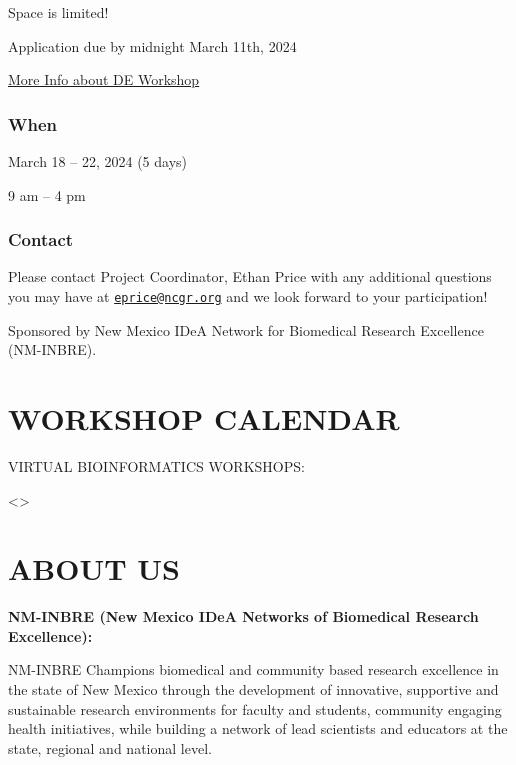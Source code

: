 \documentclass[
]{book}
\begin{document}
Space is limited!

Application due by midnight March 11th, 2024

\href{https://inbre.ncgr.org/ncgr-INBRE-2024/differential-expression-workshop.html\#differential-expression-workshop}{More Info about DE Workshop}

\hypertarget{when}{%
\subsection*{When}\label{when}}

March 18 -- 22, 2024 (5 days)

9 am -- 4 pm

\hypertarget{contact}{%
\subsection*{Contact}\label{contact}}

Please contact Project Coordinator, Ethan Price with any additional questions you may have at \href{mailto:eprice@ncgr.org}{\nolinkurl{eprice@ncgr.org}} and we look forward to your participation!

Sponsored by New Mexico IDeA Network for Biomedical Research Excellence (NM-INBRE).

\hypertarget{workshop-calendar}{%
\chapter*{WORKSHOP CALENDAR}\label{workshop-calendar}}

VIRTUAL BIOINFORMATICS WORKSHOPS:

\textless{}\textgreater{}

\hypertarget{about-us}{%
\chapter*{ABOUT US}\label{about-us}}

\textbf{NM-INBRE (New Mexico IDeA Networks of Biomedical Research Excellence):}

NM-INBRE Champions biomedical and community based research excellence in the state of New Mexico through the development of innovative, supportive and sustainable research environments for faculty and students, community engaging health initiatives, while building a network of lead scientists and educators at the state, regional and national level.
\end{document}
